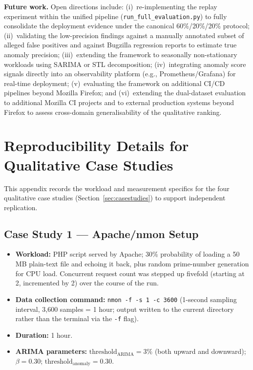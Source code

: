 \documentclass[pdflatex,sn-nature]{sn-jnl}
\theoremstyle{thmstyleone}%
\begin{document}
\textbf{Future work.}
Open directions include:
(i)~re-implementing the replay experiment within the unified pipeline
(\texttt{run\_full\_evaluation.py}) to fully consolidate the deployment
evidence under the canonical 60\%/20\%/20\% protocol;
(ii)~validating the low-precision findings against a manually annotated
subset of alleged false positives and against Bugzilla regression reports
to estimate true anomaly precision;
(iii)~extending the framework to seasonally non-stationary workloads using
SARIMA or STL decomposition;
(iv)~integrating anomaly score signals directly into an observability platform
(e.g., Prometheus/Grafana) for real-time deployment;
(v)~evaluating the framework on additional CI/CD pipelines beyond Mozilla
Firefox; and
(vi)~extending the dual-dataset evaluation to additional Mozilla CI projects
and to external production systems beyond Firefox to assess cross-domain
generalisability of the qualitative ranking.

\appendix

\section{Reproducibility Details for Qualitative Case Studies}\label{app:reproducibility}

This appendix records the workload and measurement specifics for the four
qualitative case studies (Section~\ref{sec:casestudies}) to support
independent replication.

\subsection*{Case Study 1 --- Apache/nmon Setup}
\begin{itemize}
  \item \textbf{Workload:} PHP script served by Apache; 30\% probability of
    loading a 50\,MB plain-text file and echoing it back, plus random
    prime-number generation for CPU load.
    Concurrent request count was stepped up fivefold (starting at 2,
    incremented by 2) over the course of the run.
  \item \textbf{Data collection command:} \verb|nmon -f -s 1 -c 3600|
    (1-second sampling interval, 3{,}600 samples = 1 hour; output written
    to the current directory rather than the terminal via the \texttt{-f} flag).
  \item \textbf{Duration:} 1 hour.
  \item \textbf{ARIMA parameters:} $\text{threshold}_{\text{ARIMA}} = 3\%$
    (both upward and downward); $\beta = 0.30$;
    $\text{threshold}_{\text{anomaly}} = 0.30$.
\end{itemize}
\end{document}
